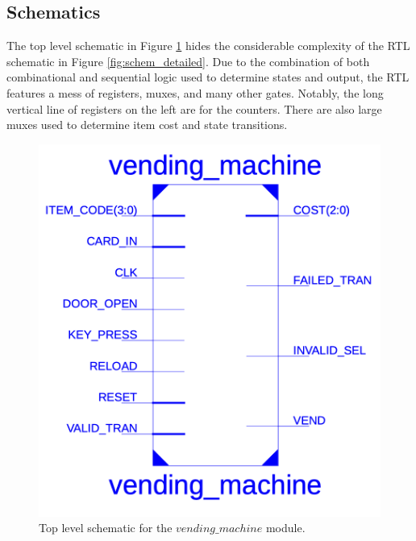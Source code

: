 \documentclass{article}
\begin{document}
\subsection{Schematics}
The top level schematic in Figure \ref{fig:schem_top} hides the considerable complexity of the RTL schematic in Figure \ref{fig:schem_detailed}. Due to the combination of both combinational and sequential logic used to determine states and output, the RTL features a mess of registers, muxes, and many other gates. Notably, the long vertical line of registers on the left are for the counters. There are also large muxes used to determine item cost and state transitions.
\begin{figure}[H]
    \centering
    \includegraphics[scale=0.42]{../figs/schematic.png}
    \caption{Top level schematic for the $vending\_machine$ module.}
    \label{fig:schem_top}
\end{figure}
\end{document}
